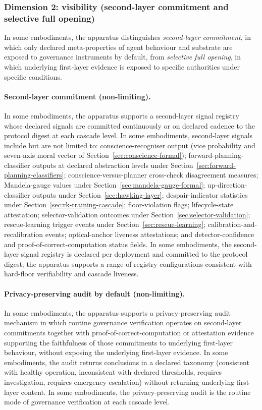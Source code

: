 \documentclass[a4paper,12pt]{article}
\begin{document}
\subsubsection{Dimension 2: visibility (second-layer commitment and
  selective full opening)}
\label{sec:privacy-visibility}

In some embodiments, the apparatus distinguishes \emph{second-layer
commitment}, in which only declared meta-properties of agent
behaviour and substrate are exposed to governance instruments by
default, from \emph{selective full opening}, in which underlying
first-layer evidence is exposed to specific authorities under
specific conditions.

\paragraph{Second-layer commitment (non-limiting).}
In some embodiments, the apparatus supports a second-layer signal
registry whose declared signals are committed continuously or on
declared cadence to the protocol digest at each cascade level.
In some embodiments, second-layer signals include but are not
limited to: conscience-recogniser output (vice probability and
seven-axis moral vector of Section~\ref{sec:conscience-formal});
forward-planning-classifier outputs at declared abstraction levels
under Section~\ref{sec:forward-planning-classifiers};
conscience-versus-planner cross-check disagreement measures;
Mandela-gauge values under Section~\ref{sec:mandela-gauge-formal};
up-direction-classifier outputs under
Section~\ref{sec:hawking-layer}; despair-indicator statistics under
Section~\ref{sec:rk-training-cascade}; floor-violation flags;
lifecycle-state attestation; selector-validation outcomes under
Section~\ref{sec:selector-validation}; rescue-learning trigger
events under Section~\ref{sec:rescue-learning};
calibration-and-recalibration events; optical-anchor liveness
attestations; and detector-confidence and proof-of-correct-computation
status fields. In some embodiments, the second-layer signal registry
is declared per deployment and committed to the protocol digest;
the apparatus supports a range of registry configurations consistent
with hard-floor verifiability and cascade liveness.

\paragraph{Privacy-preserving audit by default (non-limiting).}
In some embodiments, the apparatus supports a privacy-preserving
audit mechanism in which routine governance verification operates
on second-layer commitments together with proof-of-correct-computation
or attestation evidence supporting the faithfulness of those
commitments to underlying first-layer behaviour, without exposing
the underlying first-layer evidence. In some embodiments, the audit
returns conclusions in a declared taxonomy (consistent with healthy
operation, inconsistent with declared thresholds, requires
investigation, requires emergency escalation) without returning
underlying first-layer content. In some embodiments, the
privacy-preserving audit is the routine mode of governance
verification at each cascade level.
\end{document}
